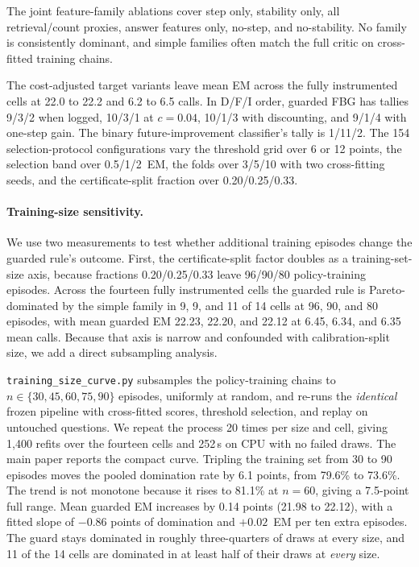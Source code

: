 \documentclass[manuscript,nonacm]{acmart}
\begin{document}
The joint feature-family ablations cover step only, stability only, all
retrieval/count proxies, answer features only, no-step, and no-stability.
No family is consistently dominant, and simple families often match the
full critic on cross-fitted training chains.

The cost-adjusted target variants leave mean EM across the fully instrumented
cells at 22.0 to 22.2 and 6.2 to 6.5 calls. In D/F/I order, guarded
FBG has tallies 9/3/2 when logged, 10/3/1 at $c=0.04$, 10/1/3 with discounting,
and 9/1/4 with one-step gain. The binary future-improvement classifier's tally is
1/11/2. The 154 selection-protocol
configurations vary the threshold grid over 6 or 12 points, the selection band
over 0.5/1/2~EM, the folds over 3/5/10 with two cross-fitting seeds, and the
certificate-split fraction over 0.20/0.25/0.33.

\paragraph{Training-size sensitivity.}
We use two measurements to test whether additional training episodes change
the guarded rule's outcome. First, the certificate-split factor doubles as a
training-set-size axis, because fractions 0.20/0.25/0.33 leave 96/90/80
policy-training episodes. Across the fourteen fully instrumented cells the guarded rule is
Pareto-dominated by the simple family in 9, 9, and 11 of 14 cells at 96, 90,
and 80 episodes, with mean guarded EM 22.23, 22.20, and 22.12 at 6.45, 6.34,
and 6.35 mean calls. Because that axis is narrow and confounded with
calibration-split size, we add a direct subsampling analysis.

\texttt{training\_size\_curve.py} subsamples the policy-training chains to
$n\in\{30,45,60,75,90\}$ episodes, uniformly at random, and re-runs the
\emph{identical} frozen pipeline with cross-fitted scores, threshold
selection, and replay on untouched questions. We repeat the process 20 times
per size and cell, giving 1{,}400 refits over the fourteen cells and 252\,s on
CPU with no failed draws. The main paper reports the compact curve. Tripling the training
set from 30 to 90 episodes moves the pooled domination rate by 6.1 points,
from 79.6\% to 73.6\%. The trend is not monotone because it rises to 81.1\%
at $n{=}60$, giving a 7.5-point full range. Mean guarded EM increases by
0.14 points (21.98 to 22.12), with a fitted slope of $-0.86$ points of
domination and $+0.02$~EM per ten extra episodes. The guard stays dominated in
roughly three-quarters of draws at every size, and 11 of the 14 cells are
dominated in at least half of their draws at \emph{every} size.
\end{document}
